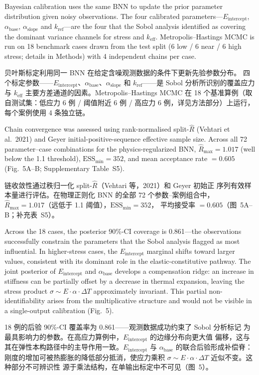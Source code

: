 \documentclass[11pt,a4paper]{article}
\newcommand{\keff}{\ensuremath{k_{\mathrm{eff}}}}
\newcommand{\Eint}{\ensuremath{E_{\mathrm{intercept}}}}
\newcommand{\abase}{\ensuremath{\alpha_{\mathrm{base}}}}
\newcommand{\aslope}{\ensuremath{\alpha_{\mathrm{slope}}}}
\newcommand{\kref}{\ensuremath{k_{\mathrm{ref}}}}
\begin{document}
Bayesian calibration uses the same BNN to update the prior parameter
distribution given noisy observations. The four calibrated
parameters---\Eint{}, \abase{}, \aslope{} and \kref{}---are the four
that the Sobol analysis identified as covering the dominant variance
channels for stress and \keff{}. Metropolis--Hastings MCMC is run on 18
benchmark cases drawn from the test split (6 low / 6 near / 6 high
stress; details in Methods) with 4 independent chains per case.

贝叶斯标定利用同一 BNN 在给定含噪观测数据的条件下更新先验参数分布。
四个标定参数——\Eint{}、\abase{}、\aslope{} 和 \kref{}——是 Sobol
分析所识别的覆盖应力与 \keff{} 主要方差通道的因素。Metropolis--Hastings
MCMC 在 18 个基准算例（取自测试集：低应力 6 例 / 阈值附近 6 例 /
高应力 6 例，详见方法部分）上运行，每个案例使用 4 条独立链。

Chain convergence was assessed using rank-normalised split-$\hat{R}$
(Vehtari et al.\ 2021) and Geyer initial-positive-sequence effective
sample size. Across all 72 parameter--case combinations for the
physics-regularized BNN, $\hat{R}_{\max} = 1.017$ (well below the 1.1
threshold), $\mathrm{ESS}_{\min} = 352$, and mean acceptance rate
$= 0.605$ (Fig.~5A--B; Supplementary
Table~S5).

链收敛性通过秩归一化 split-$\hat{R}$（Vehtari 等，2021）和 Geyer 初始正
序列有效样本量进行评估。在物理正则化 BNN 的全部 72 个参数--案例组合中，
$\hat{R}_{\max} = 1.017$（远低于 1.1 阈值），$\mathrm{ESS}_{\min} = 352$，
平均接受率 $= 0.605$（图~5A--B；补充表~S5）。

Across the 18 cases, the posterior 90\%-CI coverage is 0.861---the
observations successfully constrain the parameters that the Sobol
analysis flagged as most influential. In higher-stress cases, the
\Eint{} marginal shifts toward larger values, consistent with its
dominant role in the elastic-constitutive pathway. The joint posterior of
\Eint{} and \abase{} develops a compensation ridge: an increase in
stiffness can be partially offset by a decrease in thermal expansion,
leaving the stress product $\sigma \sim E \cdot \alpha \cdot \Delta T$
approximately invariant. This partial non-identifiability arises from
the multiplicative structure and would not be visible in a single-output
calibration (Fig.~5).

18 例的后验 90\%-CI 覆盖率为 0.861——观测数据成功约束了 Sobol 分析标记
为最具影响力的参数。在高应力算例中，\Eint{} 的边缘分布向更大值
偏移，这与其在弹性本构路径中的主导作用一致。\Eint{} 与 \abase{}
的联合后验形成补偿脊：刚度的增加可被热膨胀的降低部分抵消，使应力乘积
$\sigma \sim E \cdot \alpha \cdot \Delta T$ 近似不变。这种部分不可辨识性
源于乘法结构，在单输出标定中不可见（图~5）。
\end{document}
